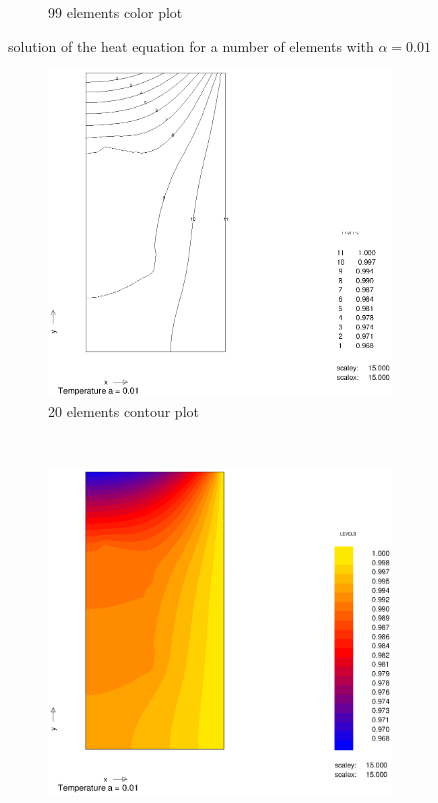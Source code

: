 \documentclass[10pt,a4paper]{article}
\begin{document}
\begin{figure}[h]
\begin{subfigure}[b]{0.45\textwidth}
                \caption{99 elements color plot}
                \label{fig:colplot_a10_99el}
        \end{subfigure}
        \caption{solution of the heat equation for a number of elements with $\alpha = 0.01$} 
        \label{fig:001}                                
\end{figure}

\begin{figure}[h]
\centering
        \begin{subfigure}[b]{0.45\textwidth}
                \includegraphics[width=\textwidth]{cont_a001_20el}
                \caption{20 elements contour plot}
                \label{fig:cont_a001_20el}
        \end{subfigure}
        ~
        \begin{subfigure}[b]{0.45\textwidth}
                \includegraphics[width=\textwidth]{colplot_a001_20el}

\end{subfigure}
\end{figure}
\end{document}
